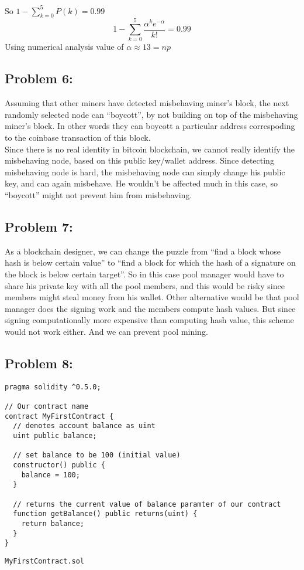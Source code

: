 \documentclass[a4paper]{article}
\begin{document}
So $1 - \sum_{k=0}^{5}P(k) = 0.99$ \\
$$1 - \sum_{k=0}^{5} \dfrac{\alpha^k e^{-\alpha}}{k!} = 0.99$$
Using numerical analysis value of $\alpha \approx 13 = np$

\subsection*{Problem 6:}
Assuming that other miners have detected misbehaving miner's block, the next randomly selected node can
``boycott'', by not building on top of the misbehaving miner's block. In other words they can boycott
a particular address correspoding to the coinbase transaction of this block. \\

Since there is no real identity in
bitcoin blockchain, we cannot really identify the misbehaving node, based on this public key/wallet address.
Since detecting misbehaving node is hard, the misbehaving node can simply change his public key, and
can again misbehave. He wouldn't be affected much in this case, so ``boycott'' might not prevent him from misbehaving.

\subsection*{Problem 7:}
As a blockchain designer, we can change the puzzle from ``find a block whose hash is below certain value'' to
``find a block for which the hash of a signature on the block is below certain target''. So in this case
pool manager would have to share his private key with all the pool members, and this would be risky
since members might steal money from his wallet. Other alternative would be that pool manager does the signing work
and the members compute hash values. But since signing computationally more expensive than computing hash value,
this scheme would not work either. And we can prevent pool mining.

\subsection*{Problem 8:}
\begin{lstlisting}[style=C++]
pragma solidity ^0.5.0;

// Our contract name
contract MyFirstContract {
  // denotes account balance as uint
  uint public balance;
  
  // set balance to be 100 (initial value)     
  constructor() public {
    balance = 100;
  }

  // returns the current value of balance paramter of our contract
  function getBalance() public returns(uint) {
    return balance;
  }
}
\end{lstlisting}
\texttt{MyFirstContract.sol} \\
\end{document}
